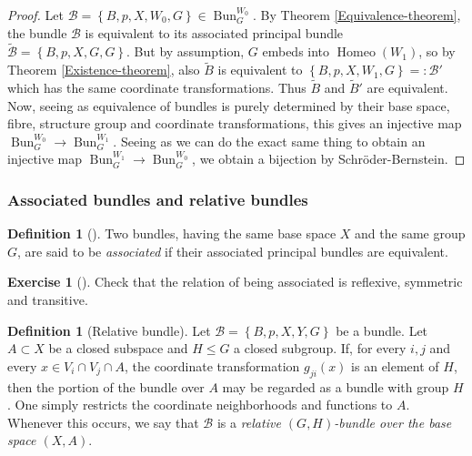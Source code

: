 \documentclass[reqno]{amsart}
\theoremstyle{definition}
\newtheorem{definition}[theorem]{Definition}
\newtheorem{exercise}[theorem]{Exercise}
\theoremstyle{remark}
\DeclareMathOperator{\Homeo}{Homeo}
\DeclareMathOperator{\Bun}{Bun}
\begin{document}
    \begin{proof}
        Let
        $\mathcal{B} = \left\{ B,p,X,W_0,G \right\} 
        \in \Bun_G^{W_0}$.
        By Theorem \ref{Equivalence-theorem}, the
        bundle $\mathcal{B}$ is equivalent
        to its associated principal bundle
        $\tilde{\mathcal{B}} = 
        \left\{ B,p,X,G,G \right\} $. But by
        assumption, $G$ embeds into
        $\Homeo(W_1)$, so by Theorem 
        \ref{Existence-theorem}, also
        $\tilde{B}$ is equivalent to
        $\left\{ B,p,X,W_1,G \right\} =:
        \mathcal{B}'$ which has the
        same coordinate transformations. Thus
        $\tilde{B}$ and $\tilde{B}'$ are equivalent.
        Now, seeing as equivalence of bundles is purely determined
        by their base space, fibre, structure group and
        coordinate transformations,
        this gives an injective map
        $\Bun_G^{W_0} \to \Bun_G^{W_1}$. Seeing
        as we can do the exact same thing to obtain an
        injective map
        $\Bun_{G}^{W_1} \to \Bun_G^{W_0}$, we obtain
        a bijection by Schröder-Bernstein.
    \end{proof}

    \subsubsection{Associated bundles and relative bundles}

    \begin{definition}[]
        Two bundles, having the same base space
        $X$ and the same group $G$, are said to be
        \textit{associated} if their associated 
        principal bundles are equivalent.
    \end{definition}

    \begin{exercise}[]
        Check that the relation of being associated is
        reflexive, symmetric and transitive.
    \end{exercise}

    \begin{definition}[Relative bundle]
        Let
        $\mathcal{B} = \left\{ B,p,X,Y,G \right\} $ be
        a bundle. Let $A \subset X$ be a closed subspace and
        $H \le G$ a closed subgroup. If, for every
        $i,j$ and every $x \in V_i \cap V_j \cap A$, the
        coordinate transformation $g_{ji}(x)$ is an
        element of $H$, then the portion of the bundle
        over $A$ may be regarded as a bundle with
        group $H$. One simply restricts the coordinate
        neighborhoods and functions to $A$. Whenever
        this occurs, we say that $\mathcal{B}$ is
        a \textit{relative $\left( G,H \right) $-bundle
        over the base space $\left( X,A \right) $}.
    \end{definition}
\end{document}
